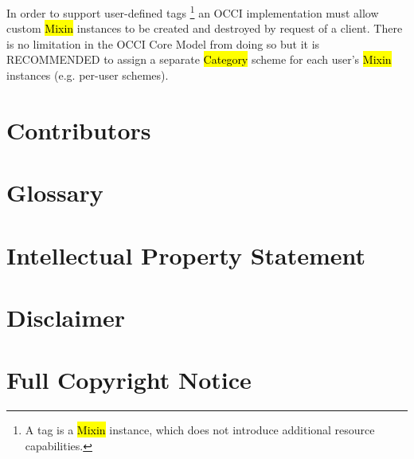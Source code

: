 \documentclass[10pt,a4paper]{article}
\begin{document}
In order to support user-defined tags%
\footnote{A tag is a \hl{Mixin} instance, which does not introduce additional
resource capabilities.}
an OCCI implementation must allow custom
\hl{Mixin} instances to be created and destroyed by request of a client.
There is no limitation in the OCCI Core Model from doing so but it is RECOMMENDED to
assign a separate \hl{Category} scheme for each user's \hl{Mixin} instances (e.g. per-user schemes).

\section{Contributors}


\section{Glossary}
\label{sec:glossary}


\section{Intellectual Property Statement}


\section{Disclaimer}


\section{Full Copyright Notice}




\end{document}
